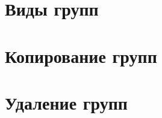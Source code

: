\documentclass[../index.tex]{subfiles}
\begin{document}
	
\section{Виды групп}

\section{Копирование групп}

\section{Удаление групп}
\end{document}
